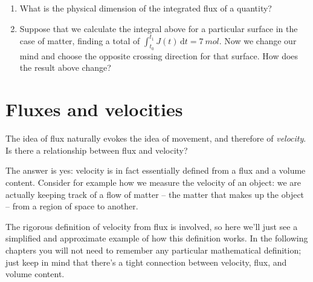 \documentclass[a4paper,12pt,%
onecolumn,oneside,titlepage,%
british%
]{memoir}
\newcommand*{\di}{\mathrm{d}}%
\renewcommand*{\|}[1][]{\nonscript\:#1\vert\nonscript\:\mathopen{}}
\newcommand*{\yti}{t_{0}}
\newcommand*{\ytf}{t_{1}}
\newcommand*{\yJ}{J}
\begin{document}
\smallskip

\begin{exercise}
  \begin{enumerate}[exerc]
  \item What is the physical dimension of the integrated flux of a quantity?
  \item Suppose that we calculate the integral above for a particular surface in the case of matter, finding a total of $\int_{\yti}^{\ytf}\!\! \yJ(t)\,\di t = \qty{7}{mol}$. Now we change our mind and choose the opposite crossing direction for that surface. How does the result above change?
  \end{enumerate}
\end{exercise}

\section{Fluxes and velocities}
\label{sec:fluxes_velocities}

The idea of flux naturally evokes the idea of movement, and therefore of \emph{velocity}. Is there a relationship between flux and velocity?

The answer is yes: velocity is in fact essentially defined from a flux and a volume content. Consider for example how we measure the velocity of an object: we are actually keeping track of a flow of matter -- the matter that makes up the object -- from a region of space to another.

The rigorous definition of velocity from flux is involved, so here we'll just see a simplified and approximate example of how this definition works. In the following chapters you will not need to remember any particular mathematical definition; just keep in mind that there's a tight connection between velocity, flux, and volume content.
\end{document}
